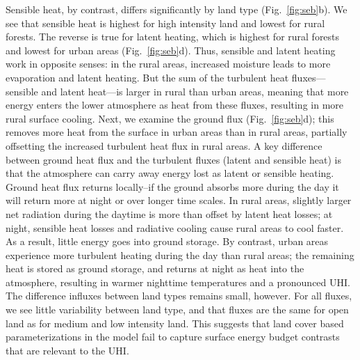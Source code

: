 \documentclass[draft,linenumbers]{agujournal}
\begin{document}
Sensible heat, by contrast, differs significantly by land type (Fig.~\ref{fig:seb}b).  
We see that sensible heat is highest for high intensity land and lowest for rural forests. The reverse is true for latent heating, which is highest for rural forests and lowest for urban areas  (Fig.~\ref{fig:seb}d). 
Thus, sensible and latent heating work in opposite senses: in the rural areas, increased moisture leads to more evaporation and latent heating. 
 But the sum of the turbulent heat fluxes---sensible and latent heat---is larger in rural than urban areas, meaning that more energy enters the lower atmosphere as heat from these fluxes, resulting in more rural surface cooling. 
Next, we examine the ground flux (Fig.~\ref{fig:seb}d); this removes more heat from the surface in urban areas than in rural areas, partially offsetting the increased turbulent heat flux in rural areas. 
A key difference between ground heat flux and the turbulent fluxes (latent and sensible heat) is that the atmosphere can carry away energy lost as latent or sensible heating.
 Ground heat flux returns locally--if the ground absorbs more during the day it will return more at night or over longer time scales.
In rural areas, slightly larger net radiation during the daytime is more than offset by latent heat losses; at night, sensible heat losses and radiative cooling cause rural areas to cool faster.  As a result, little energy goes into ground storage. 
By contrast, urban areas experience more turbulent heating during the day than rural areas; the remaining heat is stored as ground storage, and returns at night as heat into the atmosphere, resulting in warmer nighttime temperatures and a pronounced UHI. 
The difference influxes between land types remains small, however. 
For all fluxes, we see little variability between land type, and that fluxes are the same for open land as for medium and low intensity land. This suggests that land cover based parameterizations in the model fail to capture surface energy budget contrasts that are relevant to the UHI.
\end{document}
